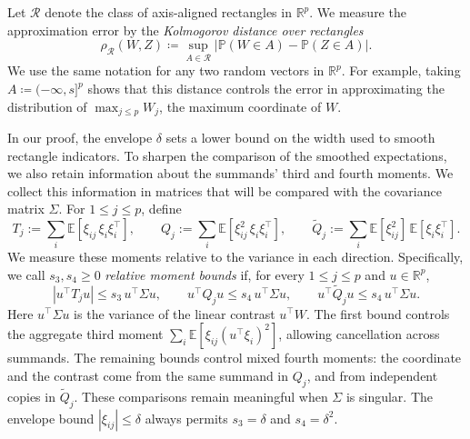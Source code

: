 \documentclass[11pt,letterpaper]{article}
\newenvironment{recovered}{}{}
\theoremstyle{remark}
\newcommand{\E}{\mathbb E}
\newcommand{\Pp}{\mathbb P}
\newcommand{\R}{\mathbb R}
\newcommand{\rh}{\rho_{\mathcal R}}
\begin{document}
Let \(\mathcal R\) denote the class of axis-aligned rectangles in
\(\R^p\). We measure the approximation error by the \emph{Kolmogorov distance over rectangles}
\[
 \rh(W,Z)\coloneqq \sup_{A\in\mathcal R}
       |\Pp(W\in A)-\Pp(Z\in A)|.
\]
We use the same notation for any two random vectors in \(\R^p\). For
example, taking \(A\coloneqq (-\infty,s]^p\) shows that this distance controls the
error in approximating the distribution of \(\max_{j\le p}W_j\), the maximum
coordinate of \(W\).

\begin{recovered}
In our proof, the envelope \(\delta\) sets a lower bound on the width
used to smooth rectangle indicators. To sharpen the comparison of the
smoothed expectations, we also retain information about the summands'
third and fourth moments. We collect this information in matrices that
will be compared with the covariance matrix \(\Sigma\). For
\(1\le j\le p\), define
\[
 T_j:=\sum_i\E[\xi_{ij}\,\xi_i\xi_i^\top],\qquad
 Q_j:=\sum_i\E[\xi_{ij}^2\,\xi_i\xi_i^\top],\qquad
 \widetilde Q_j:=\sum_i\E[\xi_{ij}^2]\,\E[\xi_i\xi_i^\top].
\]
We measure these moments relative to the variance in each direction.
Specifically, we call \(s_3,s_4\ge0\) \emph{relative moment bounds} if,
for every \(1\le j\le p\) and \(u\in\R^p\),
\begin{equation}\label{eq:relative-moments}
 |u^\top T_j u|\le s_3\,u^\top\Sigma u,\qquad
 u^\top Q_j u\le s_4\,u^\top\Sigma u,\qquad
 u^\top\widetilde Q_j u\le s_4\,u^\top\Sigma u.
\end{equation}
Here \(u^\top\Sigma u\) is the variance of the linear contrast
\(u^\top W\). The first bound controls the aggregate third moment
\(\sum_i\E[\xi_{ij}(u^\top\xi_i)^2]\), allowing cancellation across
summands. The remaining bounds control mixed fourth moments: the
coordinate and the contrast come from the same summand in \(Q_j\),
and from independent copies in \(\widetilde Q_j\). These comparisons
remain meaningful when \(\Sigma\) is singular. The envelope bound
\(|\xi_{ij}|\le\delta\) always permits \(s_3=\delta\) and
\(s_4=\delta^2\).
\end{recovered}
\end{document}

